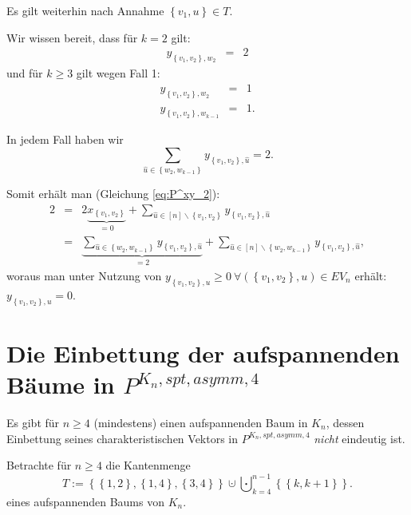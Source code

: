 \documentclass[10p,a4paper,BCOR = 12mm, DIV=15]{scrbook}
\begin{document}
{\begin{bew}
Es gilt weiterhin nach Annahme $\left\{v_1, u\right\} \in T$.

Wir wissen bereit, dass für $k=2$ gilt:
\begin{eqnarray*}
y_{\left\{v_1, v_2\right\}, w_2} & = & 2
\end{eqnarray*}
und für $k\geq 3$ gilt wegen Fall 1:
\begin{eqnarray*}
y_{\left\{v_1, v_2\right\}, w_2} & = & 1 \\
y_{\left\{v_1, v_2\right\}, w_{k-1}} & = & 1.
\end{eqnarray*}

In jedem Fall haben wir
\begin{displaymath}
\sum_{\widehat{u}\in \left\{w_2, w_{k-1}\right\}} y_{\left\{v_1, v_2\right\}, \widehat{u}} = 2.
\end{displaymath}

Somit erhält man (Gleichung \eqref{eq:P^xy_2}):
\begin{eqnarray*}
2 & = & 2 \underbrace{x_{\left\{v_1, v_2\right\}}}_{= 0} + 
\sum_{\widehat{u}\in[n]\backslash\left\{v_1, v_2\right\}} y_{\left\{v_1, v_2\right\}, \widehat{u}} \\
& = & \underbrace{\sum_{\widehat{u}\in \left\{w_2, w_{k-1}\right\}} y_{\left\{v_1, v_2\right\}, \widehat{u}}}_{ = 2} + \sum_{\widehat{u}\in \left[n\right] \backslash \left\{w_2, w_{k-1}\right\}} y_{\left\{v_1, v_2\right\}, \widehat{u}},
\end{eqnarray*}
woraus man unter Nutzung von $y_{\left\{v_1, v_2\right\}, u} \geq 0 \ \forall \left(\left\{v_1, v_2\right\}, u\right) \in EV_n$ erhält: $y_{\left\{v_1, v_2\right\}, u} = 0$.
\end{bew}

\section{Die Einbettung der aufspannenden Bäume in $P^{K_n, spt, asymm, 4}$}

\begin{Sa}
\label{sa:einb_asymm_4}
Es gibt für $n \geq 4$ (mindestens) einen aufspannenden Baum in $K_n$, dessen Einbettung seines charakteristischen Vektors in $P^{K_n, spt, asymm, 4}$ \emph{nicht} eindeutig ist.
\end{Sa}
\begin{bew}
Betrachte für $n \geq 4$ die Kantenmenge
\begin{displaymath}
T := \left\{
\left\{1, 2\right\}, \left\{1, 4\right\}, \left\{3, 4\right\}
\right\} \cupdot \bigcupdot_{k=4}^{n-1} \left\{\left\{k, k+1\right\}\right\}.
\end{displaymath}
eines aufspannenden Baums von $K_n$.


\end{bew}}
\end{document}
